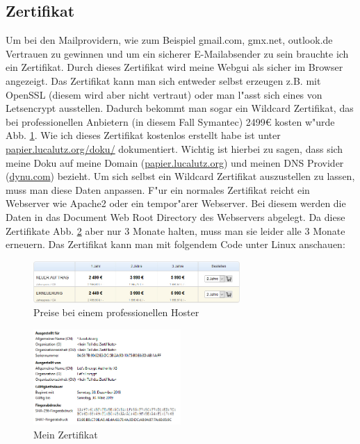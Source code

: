 \documentclass[12pt,twoside]{article}  %
\begin{document}
  \subsection{Zertifikat}
  Um bei den Mailprovidern, wie zum Beispiel gmail.com, gmx.net, outlook.de Vertrauen 
  zu gewinnen und um ein sicherer E-Mailabsender zu sein brauchte ich ein Zertifikat. Durch dieses Zertifikat wird meine Webgui 
  als sicher im Browser angezeigt. Das Zertifikat kann man sich entweder 
  selbst erzeugen z.B. mit OpenSSL (diesem wird aber nicht vertraut) oder man 
  l"asst sich eines von Letsencrypt \cite{letsencrypt} ausstellen. Dadurch bekommt man sogar ein 
  Wildcard Zertifikat, das bei professionellen Anbietern (in diesem Fall Symantec) 
  2499\euro{} kosten w"urde Abb. \ref{ZertProf}. Wie ich dieses Zertifikat kostenlos erstellt habe ist unter \url{papier.lucalutz.org/doku/}
  dokumentiert. 
  Wichtig ist hierbei zu sagen, dass sich meine Doku auf meine Domain 
  (\url{papier.lucalutz.org}) und meinen DNS Provider (\url{dynu.com}) bezieht. Um sich selbst ein Wildcard 
  Zertifikat auszustellen zu lassen, muss man diese Daten anpassen. F"ur ein normales Zertifikat reicht ein  
  Webserver wie Apache2 oder ein tempor"arer Webserver. Bei diesem werden die Daten in das 
  \glqq Document Web Root Directory\grqq{} des Webservers abgelegt. Da diese Zertifikate Abb. \ref{ZertLuca} aber nur 3 Monate halten, 
  muss man sie leider alle 3 Monate erneuern. Das Zertifikat kann man mit folgendem Code unter Linux anschauen: 
  \begin{figure}
    \includegraphics[width=0.7\textwidth]{zertifikat.jpg}
    \caption{Preise bei einem professionellen Hoster \label{ZertProf}}
  \end{figure} 
  \begin{figure}
    \includegraphics[width=0.5\textwidth]{ssl.jpg}
    \caption{Mein Zertifikat \label{ZertLuca}}
  \end{figure} 
  
\end{document}
